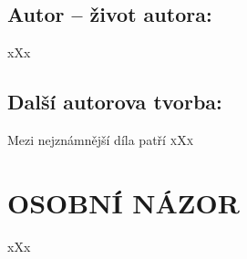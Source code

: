 \documentclass[A4paper]{extarticle} %
\begin{document}



\subsection*{Autor {\ssmall -- život autora:}}
\noindent 
xXx


\subsection*{Další autorova tvorba:}
\noindent 
Mezi nejznámnější díla patří \textsc{xXx}






\section*{OSOBNÍ NÁZOR}
\noindent 
xXx
\end{document}
